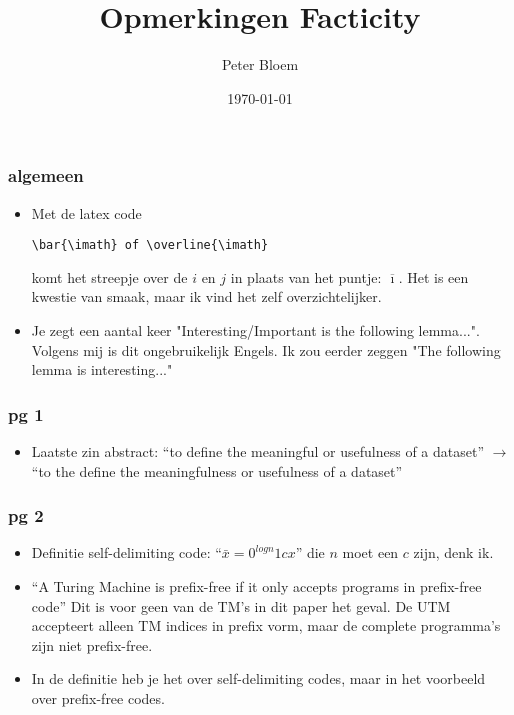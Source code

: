 \documentclass{article}
\title{Opmerkingen Facticity}
\author{Peter Bloem}
\date{\today}
\theoremstyle{definition}
\begin{document}
\maketitle

\subsubsection*{algemeen}
\begin{itemize}

    \item Met de latex code \begin{verbatim}\bar{\imath} of \overline{\imath}\end{verbatim} komt het streepje over de $i$ en $j$ in plaats van het puntje: $\overline{\imath}$. Het is een kwestie van smaak, maar ik vind het zelf overzichtelijker.
    
    \item Je zegt een aantal keer "Interesting/Important is the following lemma...". Volgens mij is dit ongebruikelijk Engels. Ik zou eerder zeggen "The following lemma is interesting..."
\end{itemize}


\subsubsection*{pg 1}
\begin{itemize}

    \item Laatste zin abstract: ``to define the meaningful or usefulness of a dataset'' $\rightarrow$ ``to the define the meaningfulness or usefulness of a dataset''
\end{itemize}


\subsubsection*{pg 2}
\begin{itemize}

    \item Definitie self-delimiting code: ``$\bar{x} = 0^{log n}1cx$'' die $n$ moet een $c$ zijn, denk ik.
    
    \item ``A Turing Machine is prefix-free if it only accepts programs in prefix-free code'' Dit is voor geen van de TM's in dit paper het geval. De UTM accepteert alleen TM indices in prefix vorm, maar de complete programma's zijn niet prefix-free.

   \item In de definitie heb je het over self-delimiting codes, maar in het voorbeeld over prefix-free codes. 
\end{itemize}
\end{document}
